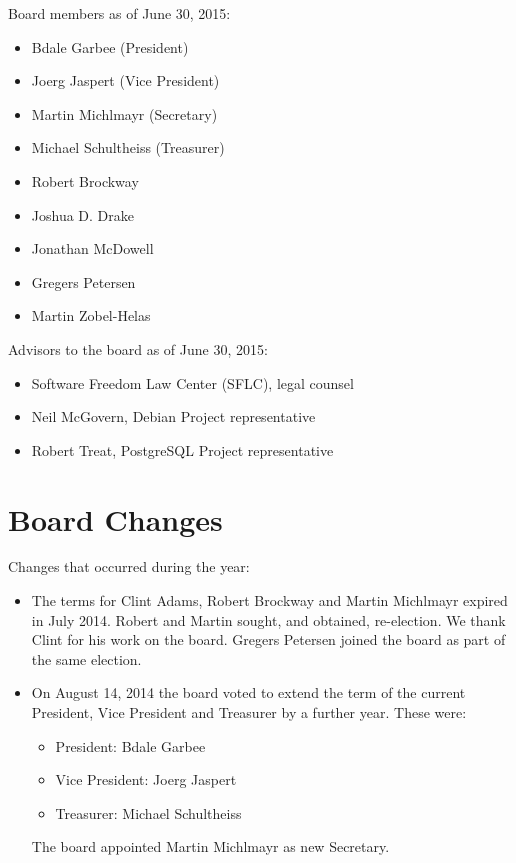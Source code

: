 \documentclass[letterpaper]{report}
\begin{document}
Board members as of June 30, 2015:

\begin{itemize}
\item Bdale Garbee (President)
\item Joerg Jaspert (Vice President)
\item Martin Michlmayr (Secretary)
\item Michael Schultheiss (Treasurer)
\item Robert Brockway
\item Joshua D. Drake
\item Jonathan McDowell
\item Gregers Petersen
\item Martin Zobel-Helas
\end{itemize}

Advisors to the board as of June 30, 2015:

\begin{itemize}
\item Software Freedom Law Center (SFLC), legal counsel
\item Neil McGovern, Debian Project representative
\item Robert Treat, PostgreSQL Project representative
\end{itemize}

\section{Board Changes}

Changes that occurred during the year:

\begin{itemize}
\item The terms for Clint Adams, Robert Brockway and Martin Michlmayr
expired in July 2014.  Robert and Martin sought, and obtained,
re-election.  We thank Clint for his work on the board.  Gregers
Petersen joined the board as part of the same election.
\item On August 14, 2014 the board voted to extend the term of the
current President, Vice President and Treasurer by a further year.
These were:
\begin{itemize}
\item President: Bdale Garbee
\item Vice President: Joerg Jaspert
\item Treasurer: Michael Schultheiss
\end{itemize}
The board appointed Martin Michlmayr as new Secretary.
\end{itemize}
\end{document}
